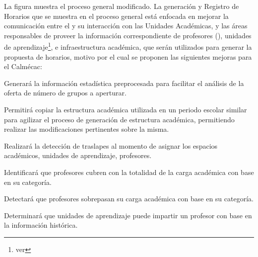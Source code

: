 La figura  muestra el proceso general modificado. La generación y Registro de Horarios que se muestra en el proceso general está enfocada en mejorar la comunicación entre el  y su interacción con las Unidades Académicas, y las áreas responsables de proveer la información correspondiente de profesores (), unidades de aprendizaje\footnote{ver }, e infraestructura académica, que serán utilizados para generar la propuesta de horarios, motivo por el cual se proponen las siguientes mejoras para el Calmécac:

\begin{Citemize}
	\item Generará la información estadística preprocesada para facilitar el análisis de la oferta de número de grupos a aperturar.
	\item Permitirá copiar la estructura académica utilizada en un periodo escolar similar para agilizar el proceso de generación de estructura académica, permitiendo realizar las modificaciones pertinentes sobre la misma.
	\item Realizará la detección de traslapes al momento de asignar los espacios académicos, unidades de aprendizaje, profesores.
	\item Identificará que profesores cubren con la totalidad de la carga académica con base en su categoría.
	\item Detectará que profesores sobrepasan su carga académica con base en su categoría.
	\item Determinará que unidades de aprendizaje puede impartir un profesor con base en la información histórica.
	
	


	
\end{Citemize}

